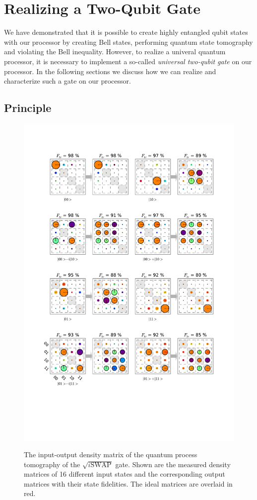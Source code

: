 \section{Realizing a Two-Qubit Gate}

We have demonstrated that it is possible to create highly entangled qubit states with our processor by creating Bell states, performing quantum state tomography and violating the Bell inequality. However, to realize a univeral quantum processor, it is necessary to implement a so-called {\it universal two-qubit gate} on our processor. In the following sections we discuss how we can realize and characterize such a gate on our processor.

\subsection{Principle}

\begin{figure}[p]
	\centering
		\includegraphics[width=1.0\textwidth]{"./data/ct5/2011_04_21 - grover and tomo/good_data/process -matrices 1"}
	\label{fig:ProcessInputOutputMatrices1}
	\caption{The input-output density matrix of the quantum process tomography of the $\sqrt{i\mathrm{SWAP}}$ gate. Shown are the measured density matrices of 16 different input states and the corresponding output matrices with their state fidelities. The ideal matrices are overlaid in red.}
\end{figure}

